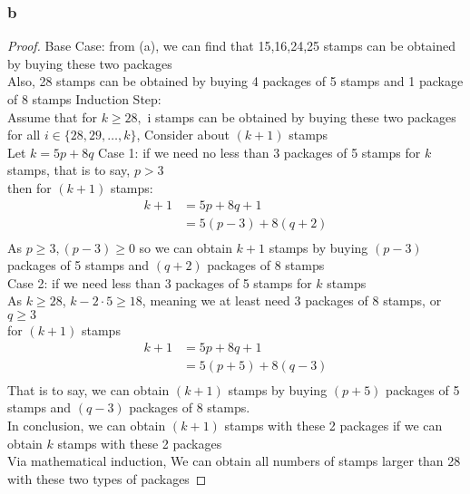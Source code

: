 \documentclass{article}
\begin{document}
\subsubsection{b}
\begin{proof}
    Base Case: from (a), we can find that 15,16,24,25 stamps can be obtained by buying these two packages\\
    Also, 28 stamps can be obtained by buying 4 packages of 5 stamps and 1 package of 8 stamps
    Induction Step: \\
    Assume that for $k \geq 28,$ i stamps can be obtained by buying these two packages for all $i \in \{28,29,\ldots, k\}$, Consider about $(k+1)$ stamps\\
    Let $k = 5p + 8q$
    Case 1: if we need no less than 3 packages of 5 stamps for $k$ stamps, that is to say, $p > 3$\\
    then for $(k+1)$ stamps:
    \begin{align*}
        k + 1 &= 5p +8q +1 \tag{By substitution}\\
        &= 5(p-3) + 8(q + 2) \tag{By algebra}\\
    \end{align*}
    As $p \geq 3, (p-3) \geq 0$ so we can obtain $k+1$ stamps by buying $(p-3)$ packages of 5 stamps and $(q+2)$ packages of 8 stamps\\
    Case 2: if we need less than 3 packages of 5 stamps for $k$ stamps\\
    As $k \geq 28$, $k-2\cdot5 \geq 18$, meaning we at least need 3 packages of 8 stamps, or $q \geq 3$\\
    for $(k+1)$ stamps\\
    \begin{align*}
        k+1 &= 5p + 8q + 1 \tag{By substitution}\\
        &= 5(p+5) + 8(q-3) \tag{By algebra}\\
    \end{align*}
    That is to say, we can obtain $(k+1)$ stamps by buying $(p+5)$ packages of 5 stamps and $(q-3)$ packages of 8 stamps.\\
    In conclusion, we can obtain $(k+1)$ stamps with these 2 packages if we can obtain $k$ stamps with these 2 packages\\
    Via mathematical induction, We can obtain all numbers of stamps larger than 28 with these two types of packages
\end{proof}
\end{document}
